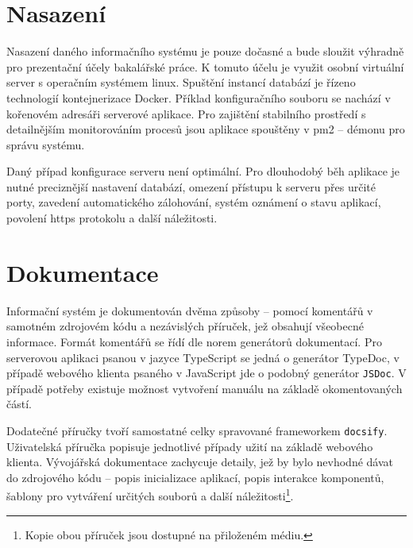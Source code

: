 

\section{Nasazení}

Nasazení daného informačního systému je pouze dočasné a bude sloužit výhradně pro prezentační účely bakalářské práce. K tomuto účelu je využit osobní virtuální server s operačním systémem linux. Spuštění instancí databází je řízeno technologií kontejnerizace Docker. Příklad konfiguračního souboru se nachází v kořenovém adresáři serverové aplikace. Pro zajištění stabilního prostředí s detailnějším monitorováním procesů jsou aplikace spouštěny v pm2 -- démonu pro správu systému.

Daný případ konfigurace serveru není optimální. Pro dlouhodobý běh aplikace je nutné preciznější nastavení databází, omezení přístupu k serveru přes určité porty, zavedení automatického zálohování, systém oznámení o stavu aplikací, povolení \gls{https} protokolu a další náležitosti.




\section{Dokumentace}

Informační systém je dokumentován dvěma způsoby -- pomocí komentářů v samotném zdrojovém kódu a nezávislých příruček, jež obsahují všeobecné informace. Formát komentářů se řídí dle norem generátorů dokumentací. Pro serverovou aplikaci psanou v jazyce TypeScript se jedná o generátor TypeDoc, v případě webového klienta psaného v JavaScript jde o podobný generátor \texttt{JSDoc}. V případě potřeby existuje možnost vytvoření manuálu na základě okomentovaných částí.

Dodatečné příručky tvoří samostatné celky spravované frameworkem \texttt{docsify}. Uživatelská příručka popisuje jednotlivé případy užití na základě webového klienta. Vývojářská dokumentace zachycuje detaily, jež by bylo nevhodné dávat do zdrojového kódu -- popis inicializace aplikací, popis interakce komponentů, šablony pro vytváření určitých souborů a další náležitosti\footnote{Kopie obou příruček jsou dostupné na přiloženém médiu.}.

